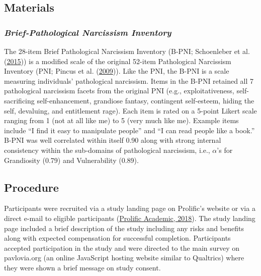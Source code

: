 \documentclass[
  donotrepeattitle,doc, 12pt, a4paper,floatsintext]{apa7}
\begin{document}
\hypertarget{materials-1}{%
\subsection{Materials}\label{materials-1}}

\hypertarget{brief-pathological-narcissism-inventory}{%
\subsubsection{\texorpdfstring{\emph{Brief-Pathological Narcissism Inventory}}{Brief-Pathological Narcissism Inventory}}\label{brief-pathological-narcissism-inventory}}

The 28-item Brief Pathological Narcissism Inventory (B-PNI; Schoenleber et al. (\protect\hyperlink{ref-schoenleber2015}{2015})) is a modified scale of the original 52-item Pathological Narcissism Inventory (PNI; Pincus et al. (\protect\hyperlink{ref-pincus2009}{2009})). Like the PNI, the B-PNI is a scale measuring individuals' pathological narcissism. Items in the B-PNI retained all 7 pathological narcissism facets from the original PNI (e.g., exploitativeness, self-sacrificing self-enhancement, grandiose fantasy, contingent self-esteem, hiding the self, devaluing, and entitlement rage). Each item is rated on a 5-point Likert scale ranging from 1 (not at all like me) to 5 (very much like me). Example items include ``I find it easy to manipulate people'' and ``I can read people like a book.'' B-PNI was well correlated within itself 0.90 along with strong internal consistency within the sub-domains of pathological narcissism, i.e., \(\alpha\)'s for Grandiosity (0.79) and Vulnerability (0.89).

\hypertarget{procedure-1}{%
\subsection{Procedure}\label{procedure-1}}

Participants were recruited via a study landing page on Prolific's website or via a direct e-mail to eligible participants (\protect\hyperlink{ref-prolificacademic2018}{Prolific Academic, 2018}). The study landing page included a brief description of the study including any risks and benefits along with expected compensation for successful completion. Participants accepted participation in the study and were directed to the main survey on pavlovia.org (an online JavaScript hosting website similar to Qualtrics) where they were shown a brief message on study consent.
\end{document}

